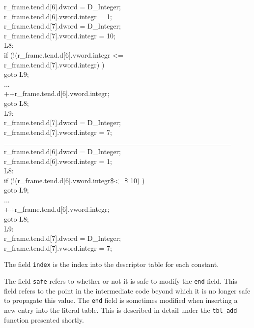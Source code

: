 \begin{iconcode}
\>   r\_frame.tend.d[6].dword = D\_Integer; \\
\>   r\_frame.tend.d[6].vword.integr = 1; \\
\>   r\_frame.tend.d[7].dword = D\_Integer; \\
\>   r\_frame.tend.d[7].vword.integr = 10; \\
L8: \\
\>   if (!(r\_frame.tend.d[6].vword.integr {\textless}= \\
\> \> \> \> \> r\_frame.tend.d[7].vword.integr) ) \\
\>  goto L9; \\
\>   ... \\
\>   ++r\_frame.tend.d[6].vword.integr; \\
\>   goto L8; \\
L9: \\
\>   r\_frame.tend.d[7].dword = D\_Integer; \\
\>   r\_frame.tend.d[7].vword.integr = 7; \\
\_\_\_\_\_\_\_\_\_\_\_\_\_\_\_\_\_\_\_\_\_\_\_\_\_\_\_\_\_\_\_\_\_\_\_\_\_\_\_\_\_\_\_\_ \\
\>   r\_frame.tend.d[6].dword = D\_Integer; \\
\>   r\_frame.tend.d[6].vword.integr = 1; \\
L8: \\
\>   if (!(r\_frame.tend.d[6].vword.integr\${\textless}=\$ 10) ) \\
\> \>    goto L9; \\
\>   ... \\
\>   ++r\_frame.tend.d[6].vword.integr; \\
\>   goto L8; \\
L9: \\
\>   r\_frame.tend.d[7].dword = D\_Integer; \\
\>   r\_frame.tend.d[7].vword.integr = 7;
\end{iconcode}


The field \texttt{index} is the index into the descriptor table for
each constant.


The field \texttt{safe} refers to whether or not it is safe to modify
the \texttt{end} field. This field refers to the point in the
intermediate code beyond which it is no longer safe to propagate this
value. The \texttt{end} field is sometimes modified when inserting a
new entry into the literal table. This is described in detail under
the \texttt{tbl\_add} function presented shortly.


